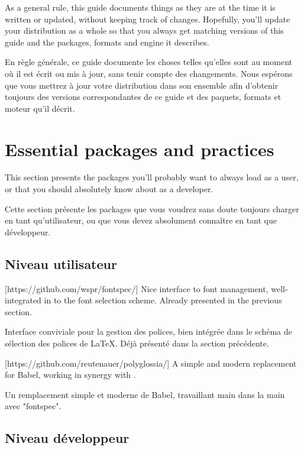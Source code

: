 \documentclass{lltxdoc}
\begin{document}
As a general rule, this guide documents things as they are at the time it is
written or updated, without keeping track of changes. Hopefully, you'll update
your distribution as a whole so that you always get matching versions of this
guide and the packages, formats and engine it describes.

En règle générale, ce guide documente les choses telles qu'elles sont au moment où il est écrit ou mis à jour, sans tenir compte des changements. Nous espérons que vous mettrez à jour votre distribution dans son ensemble afin d'obtenir toujours des versions correspondantes de ce guide et des paquets, formats et moteur qu'il décrit.


\section{Essential packages and practices}\label{essential}

This section presents the packages you'll probably want to always load as a
user, or that you should absolutely know about as a developer.

Cette section présente les packages que vous voudrez sans doute toujours charger en tant qu'utilisateur, ou que vous devez absolument connaître en tant que développeur.

\subsection{Niveau utilisateur}

[https://github.com/wspr/fontspec/]
Nice interface to font management, well-integrated in to the \latex font
selection scheme. Already presented in the previous section.

Interface conviviale pour la gestion des polices, bien intégrée dans le schéma de sélection des polices de LaTeX. Déjà présenté dans la section précédente.

[https://github.com/reutenauer/polyglossia/]
A simple and modern replacement for Babel, working in synergy with .

Un remplacement simple et moderne de Babel, travaillant main dans la main avec "fontspec".

\subsection{Niveau développeur}
\end{document}
